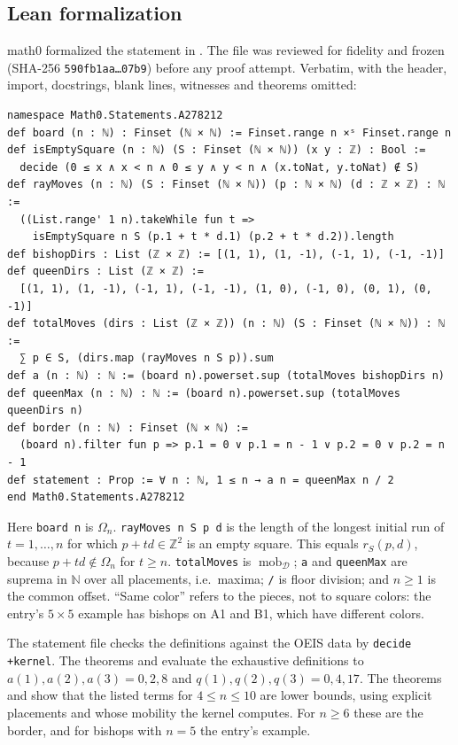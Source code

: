 \documentclass[11pt]{amsart}
\theoremstyle{plain}
\theoremstyle{definition}
\newcommand{\N}{\mathbb{N}}
\newcommand{\Z}{\mathbb{Z}}
\newcommand{\mob}{\operatorname{mob}}
\begin{document}
\subsection*{Lean formalization}
math0 formalized the statement in . The file was reviewed for fidelity and frozen (SHA-256 \texttt{590fb1aa\ldots 07b9}) before any proof attempt. Verbatim, with the header, import, docstrings, blank lines, witnesses and theorems omitted:
\begin{lstlisting}
namespace Math0.Statements.A278212
def board (n : ℕ) : Finset (ℕ × ℕ) := Finset.range n ×ˢ Finset.range n
def isEmptySquare (n : ℕ) (S : Finset (ℕ × ℕ)) (x y : ℤ) : Bool :=
  decide (0 ≤ x ∧ x < n ∧ 0 ≤ y ∧ y < n ∧ (x.toNat, y.toNat) ∉ S)
def rayMoves (n : ℕ) (S : Finset (ℕ × ℕ)) (p : ℕ × ℕ) (d : ℤ × ℤ) : ℕ :=
  ((List.range' 1 n).takeWhile fun t =>
    isEmptySquare n S (p.1 + t * d.1) (p.2 + t * d.2)).length
def bishopDirs : List (ℤ × ℤ) := [(1, 1), (1, -1), (-1, 1), (-1, -1)]
def queenDirs : List (ℤ × ℤ) :=
  [(1, 1), (1, -1), (-1, 1), (-1, -1), (1, 0), (-1, 0), (0, 1), (0, -1)]
def totalMoves (dirs : List (ℤ × ℤ)) (n : ℕ) (S : Finset (ℕ × ℕ)) : ℕ :=
  ∑ p ∈ S, (dirs.map (rayMoves n S p)).sum
def a (n : ℕ) : ℕ := (board n).powerset.sup (totalMoves bishopDirs n)
def queenMax (n : ℕ) : ℕ := (board n).powerset.sup (totalMoves queenDirs n)
def border (n : ℕ) : Finset (ℕ × ℕ) :=
  (board n).filter fun p => p.1 = 0 ∨ p.1 = n - 1 ∨ p.2 = 0 ∨ p.2 = n - 1
def statement : Prop := ∀ n : ℕ, 1 ≤ n → a n = queenMax n / 2
end Math0.Statements.A278212
\end{lstlisting}
Here \texttt{board n} is $\Omega_n$. \texttt{rayMoves n S p d} is the length of the longest initial run of $t=1,\dots,n$ for which $p+td\in\Z^2$ is an empty square. This equals $r_S(p,d)$, because $p+td\notin\Omega_n$ for $t\ge n$. \texttt{totalMoves} is $\mob_{\mathcal D}$; \texttt{a} and \texttt{queenMax} are suprema in $\N$ over all placements, i.e.\ maxima; \texttt{/} is floor division; and $n\ge1$ is the common offset. ``Same color'' refers to the pieces, not to square colors: the entry's $5\times5$ example has bishops on A1 and B1, which have different colors.

The statement file checks the definitions against the OEIS data by \texttt{decide +kernel}. The theorems  and  evaluate the exhaustive definitions to $a(1),a(2),a(3)=0,2,8$ and $q(1),q(2),q(3)=0,4,17$. The theorems  and  show that the listed terms for $4\le n\le10$ are lower bounds, using explicit placements  and  whose mobility the kernel computes. For $n\ge6$ these are the border, and for bishops with $n=5$ the entry's example.
\end{document}
